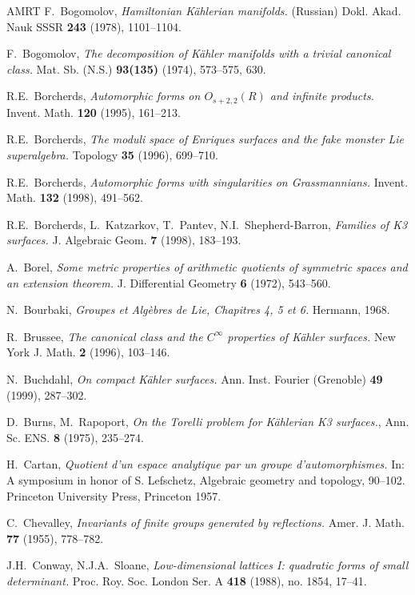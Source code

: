 \documentclass[a4paper,11pt]{article}
\begin{document}
\begin{thebibliography}{AMRT}
 F.~Bogomolov, {\it Hamiltonian K\"ahlerian
  manifolds.} (Russian) Dokl. Akad. Nauk SSSR {\bf 243} (1978),
  1101--1104.

 F.~Bogomolov, {\it The decomposition of K\"ahler
  manifolds with a trivial canonical class.}  Mat. Sb. (N.S.) {\bf
  93(135)} (1974), 573--575, 630.

 R.E.~Borcherds, {\it Automorphic forms on
  $O_{s+2,2}(R)$ and infinite products.}  Invent. Math. {\bf 120}
  (1995), 161--213.

 R.E.~Borcherds, {\it The moduli space of Enriques
  surfaces and the fake monster Lie superalgebra.} Topology {\bf 35}
  (1996), 699--710.

 R.E.~Borcherds, {\it Automorphic forms with
  singularities on Grassmannians.}  Invent. Math. {\bf 132} (1998),
  491--562.

 R.E.~Borcherds, L.~Katzarkov, T.~Pantev,
  N.I.~Shepherd-Barron, {\it Families of K3 surfaces.} J.
  Algebraic Geom. {\bf 7} (1998), 183--193.

 A.~Borel, {\it Some metric properties of arithmetic
  quotients of symmetric spaces and an extension theorem.} J.
  Differential Geometry {\bf 6} (1972), 543--560.

 N.~Bourbaki, {\it Groupes et Alg\`ebres de Lie,
  Chapitres 4, 5 et 6.} Hermann, 1968.

 R.~Brussee, {\it The canonical class and the
  $C^\infty$ properties of K\"ahler surfaces.} New York J. Math. {\bf
  2} (1996), 103--146.

 N.~Buchdahl, {\it On compact K\"ahler surfaces.}
  Ann. Inst. Fourier (Grenoble)  {\bf 49}  (1999),  287--302.

 D.~Burns, M.~Rapoport, {\it On the Torelli problem
  for K\"ahlerian K3 surfaces.}, Ann. Sc. ENS. {\bf 8} (1975), 235--274.

 H.~Cartan, {\it Quotient d'un espace analytique par
  un groupe d'auto\-morphismes.} In: A symposium in honor of
  S. Lefschetz, Algebraic geometry and topology, 90--102. Princeton
  University Press, Princeton 1957.

 C.~Chevalley, {\it Invariants of finite groups
  generated by reflections.}  Amer. J. Math. {\bf 77} (1955),
  778--782.

 J.H.~Conway, N.J.A.~Sloane, \emph{Low-dimensional
  lattices I: quadratic forms of small determinant.}
  Proc. Roy. Soc. London Ser. A {\bf 418} (1988), no. 1854, 17--41.


\end{thebibliography}
\end{document}
